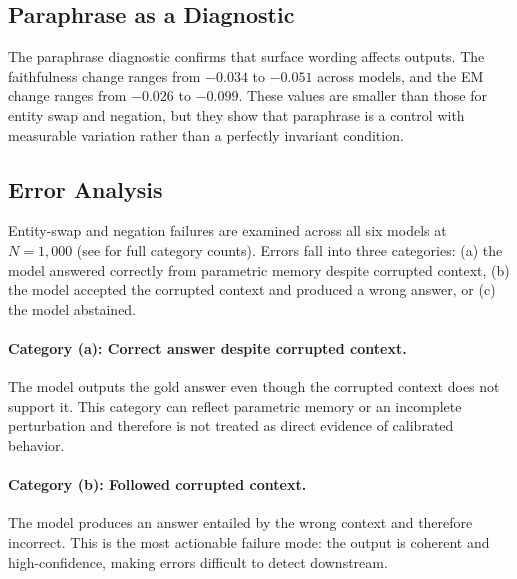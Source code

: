 \documentclass[11pt]{article}
\begin{document}
\subsection{Paraphrase as a Diagnostic}

The paraphrase diagnostic confirms that surface wording affects outputs. The faithfulness
change ranges from $-0.034$ to $-0.051$ across models, and the EM change ranges from
$-0.026$ to $-0.099$. These values are smaller than those for entity swap and negation,
but they show that paraphrase is a control with measurable variation rather than a
perfectly invariant condition.

\subsection{Error Analysis}

Entity-swap and negation failures are examined across all six models at $N=1{,}000$ (see
 for full category counts). Errors fall into
three categories: (a) the model answered correctly from parametric memory despite
corrupted context, (b) the model accepted the corrupted context and produced a wrong
answer, or (c) the model abstained.

\paragraph{Category (a): Correct answer despite corrupted context.}
The model outputs the gold answer even though the corrupted context does not support it.
This category can reflect parametric memory or an incomplete perturbation and therefore
is not treated as direct evidence of calibrated behavior.

\paragraph{Category (b): Followed corrupted context.}
The model produces an answer entailed by the wrong context and therefore incorrect. This
is the most actionable failure mode: the output is coherent and high-confidence, making
errors difficult to detect downstream.
\end{document}
